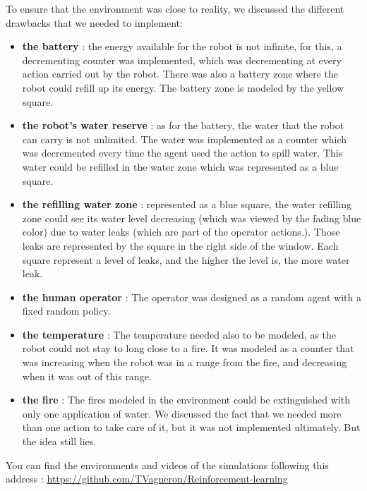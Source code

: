 \documentclass[conference]{IEEEtran}
\begin{document}
To ensure that the environment was close to reality, we discussed the different drawbacks that we needed to implement:
\begin{itemize}
 \item \textbf{the battery} : the energy available for the robot is not infinite, for this, a decrementing counter was implemented, which was decrementing at every action carried out by the robot. There was also a battery zone where the robot could refill up its energy. The battery zone is modeled by the yellow square.\\
 \item \textbf{the robot's water reserve} : as for the battery, the water that the robot can carry is not unlimited. The water was implemented as a counter which was decremented every time the agent used the action to spill water. This water could be refilled in the water zone which was represented as a blue square.\\
 \item \textbf{the refilling water zone} : represented as a blue square, the water refilling zone could see its water level decreasing (which was viewed by the fading blue color) due to water leaks (which are part of the operator actions.). Those leaks are represented by the square in the right side of the window. Each square represent a level of leaks, and the higher the level is, the more water leak.\\ 
 \item \textbf{the human operator} : The operator was designed as a random agent with a fixed random policy.\\
 \item \textbf{the temperature} : The temperature needed also to be modeled, as the robot could not stay to long close to a fire. It was modeled as a counter that was increasing when the robot was in a range from the fire, and decreasing when it was out of this range.\\
 \item \textbf{the fire} : The fires modeled in the environment could be extinguished with only one application of water. We discussed the fact that we needed more than one action to take care of it, but it was not implemented ultimately. But the idea still lies.
\end{itemize}

You can find the environments and videos of the simulations following this address :
\url{https://github.com/TVagneron/Reinforcement-learning}\\
\end{document}

